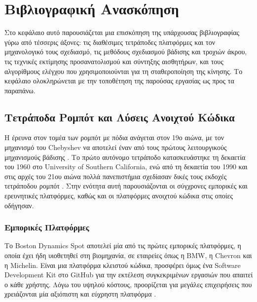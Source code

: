 \documentclass[11pt]{report}
\begin{document}
\chapter{Βιβλιογραφική Ανασκόπηση}
Στο κεφάλαιο αυτό παρουσιάζεται μια επισκόπηση της υπάρχουσας βιβλιογραφίας γύρω από
τέσσερις άξονες: τις διαθέσιμες τετράποδες πλατφόρμες και τον μηχανολογικό τους
σχεδιασμό, τις μεθόδους σχεδιασμού βάδισης και τροχιών άκρου, τις τεχνικές
εκτίμησης προσανατολισμού και σύντηξης αισθητήρων, και τους αλγορίθμους ελέγχου
που χρησιμοποιούνται για τη σταθεροποίηση της κίνησης. Το κεφάλαιο ολοκληρώνεται
με την τοποθέτηση της παρούσας εργασίας ως προς τα παραπάνω.

\section{Τετράποδα Ρομπότ και Λύσεις Ανοιχτού Κώδικα}
Η έρευνα στον τομέα των ρομπότ με πόδια ανάγεται στον 19ο αιώνα, με τον
μηχανισμό του Chebyshev να αποτελεί έναν από τους πρώτους λειτουργικούς
μηχανισμούς βάδισης \cite{biswal_development_2021}. Το πρώτο αυτόνομο τετράποδο
κατασκευάστηκε τη δεκαετία του 1960 στο University of Southern California, ενώ
από τη δεκαετία του 1990 και στις αρχές του 21ου αιώνα πολλά πανεπιστήμια
σχεδίασαν δικές τους εκδοχές τετράποδου ρομπότ \cite{biswal_development_2021}.
Στην ενότητα αυτή παρουσιάζονται οι σύγχρονες εμπορικές και ερευνητικές
πλατφόρμες, καθώς και οι πλατφόρμες ανοιχτού κώδικα στις οποίες οδήγησαν.


\subsection{Εμπορικές Πλατφόρμες}
Το Boston Dynamics Spot αποτελεί μία από τις πρώτες εμπορικές πλατφόρμες, η
οποία έχει ήδη υιοθετηθεί στη βιομηχανία, σε εταιρείες όπως η BMW, η Chevron και η
Michelin. Είναι μια πλατφόρμα κλειστού κώδικα, προσφέρει όμως ένα Software
Development Kit στο GitHub για την εκτέλεση συγκεκριμένων εργασιών που απαιτεί ο
κάθε χρήστης. Λόγω του υψηλού κόστους, προορίζεται για μεγάλες επιχειρήσεις που
χρειάζονται μία αξιόπιστη και εύχρηστη πλατφόρμα \cite{bostondynamics_spot}.
\end{document}
